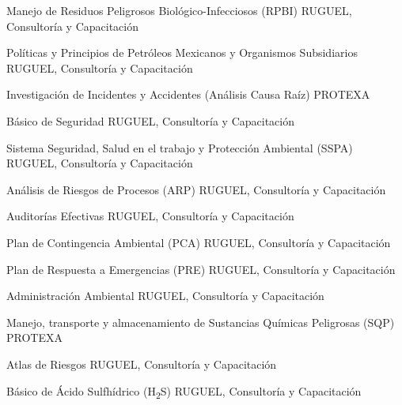 \documentclass[10pt, letterpaper, roman]{moderncv}
\begin{document}
		{Manejo de Residuos Peligrosos Biológico-Infecciosos (RPBI)}
		{\newline RUGUEL, Consultoría y Capacitación}
		{}
		{}
		{}

		{Políticas y Principios de Petróleos Mexicanos y Organismos 
		Subsidiarios}
		{\newline RUGUEL, Consultoría y Capacitación}
		{}
		{}
		{}

		{Investigación de Incidentes y Accidentes (Análisis Causa Raíz)}
		{\newline PROTEXA}
		{}
		{}
		{}

		{Básico de Seguridad}
		{\newline RUGUEL, Consultoría y Capacitación}
		{}
		{}
		{}

		{Sistema Seguridad, Salud en el trabajo y Protección Ambiental (SSPA)}
		{\newline RUGUEL, Consultoría y Capacitación}
		{}
		{}
		{}

		{Análisis de Riesgos de Procesos (ARP)}
		{\newline RUGUEL, Consultoría y Capacitación}
		{}
		{}
		{}

		{Auditorías Efectivas}
		{\newline RUGUEL, Consultoría y Capacitación}
		{}
		{}
		{}

		{Plan de Contingencia Ambiental (PCA)}
		{\newline RUGUEL, Consultoría y Capacitación}
		{}
		{}
		{}

		{Plan de Respuesta a Emergencias (PRE)}
		{\newline RUGUEL, Consultoría y Capacitación}
		{}
		{}
		{}

		{Administración Ambiental}
		{\newline RUGUEL, Consultoría y Capacitación}
		{}
		{}
		{}
		
		{Manejo, transporte y almacenamiento de Sustancias Químicas Peligrosas 
		(SQP)}
		{\newline PROTEXA}
		{}
		{}
		{}
		
		{Atlas de Riesgos}
		{\newline RUGUEL, Consultoría y Capacitación}
		{}
		{}
		{}

		{Básico de Ácido Sulfhídrico (\texorpdfstring{H\textsubscript{2}S}{})}
		{\newline RUGUEL, Consultoría y Capacitación}
		{}
		{}
		{}
\end{document}
